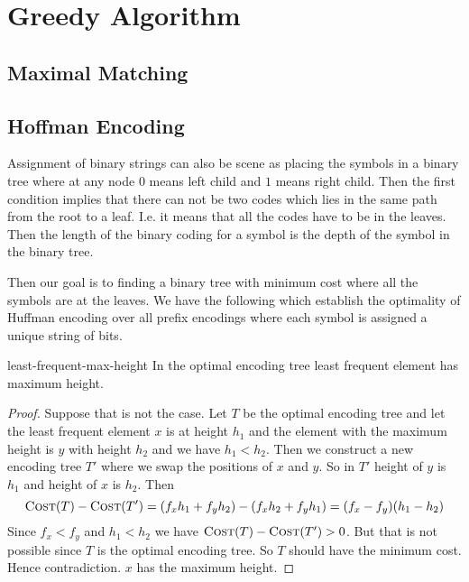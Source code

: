\chapter{Greedy Algorithm}

\section{Maximal Matching}

\section{Hoffman Encoding}
\begin{algoprob}
\end{algoprob}

Assignment of binary strings can also be scene as placing the symbols in a binary tree where at any node $0$ means left child and $1$ means right child. Then the first condition implies that there can not be two codes which lies in the same path from the root to a leaf. I.e. it means that all the codes have to be in the leaves. Then the length of the binary coding for a symbol  is the depth of the symbol in the binary tree. 

Then our goal is to finding a binary tree with minimum cost where all the symbols are at the leaves. We have the following which establish the optimality of Huffman encoding over all prefix encodings where each symbol is assigned a unique string of bits.
\begin{lemma}{}{least-frequent-max-height}
	In the optimal encoding tree  least frequent element has maximum height.
\end{lemma}
\begin{proof}
	Suppose that is not the case. Let $T$ be the optimal encoding tree and let the least frequent element $x$ is at height $h_1$ and the element with the maximum height is $y$ with height $h_2$ and we have $h_1<h_2$.  Then we construct a new encoding tree $T'$ where we swap the positions of $x$ and $y$. So in $T'$ height of $y$ is $h_1$ and height of $x$ is $h_2$. Then $$\textsc{Cost}(T)-\textsc{Cost}(T')=(f_xh_1+f_yh_2)-(f_xh_2+f_yh_1)=(f_x-f_y)(h_1-h_2)$$Since $f_x<f_y$ and $h_1<h_2$ we have $\textsc{Cost}(T)-\textsc{Cost}(T')>0$. But that is not possible since $T$ is the optimal encoding tree. So $T$ should have the minimum cost. Hence contradiction. $x$ has the maximum height.
\end{proof}

